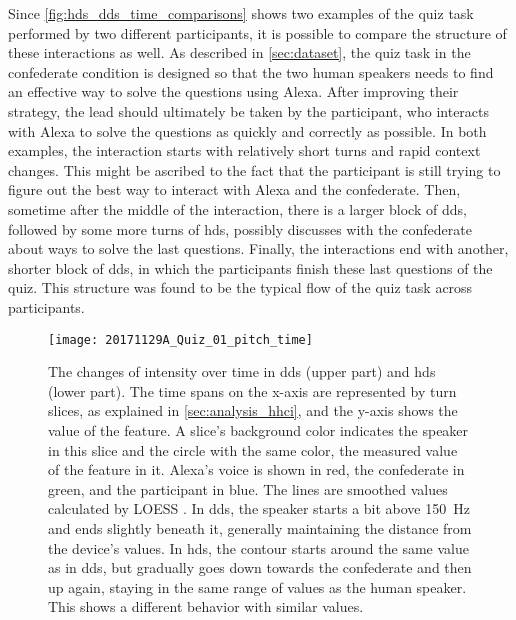 Since \cref{fig:hds_dds_time_comparisons} shows two examples of the quiz task performed by two different participants, it is possible to compare the structure of these interactions as well.
As described in \cref{sec:dataset}, the quiz task in the confederate condition is designed so that the two human speakers needs to find an effective way to solve the questions using Alexa.
After improving their strategy, the lead should ultimately be taken by the participant, who interacts with Alexa to solve the questions as quickly and correctly as possible.
In both examples, the interaction starts with relatively short turns and rapid context changes.
This might be ascribed to the fact that the participant is still trying to figure out the best way to interact with Alexa and the confederate.
Then, sometime after the middle of the interaction, there is a larger block of \ac{dds}, followed by some more turns of \ac{hds}, possibly discusses with the confederate about ways to solve the last questions.
Finally, the interactions end with another, shorter block of \ac{dds}, in which the participants finish these last questions of the quiz.
This structure was found to be the typical flow of the quiz task across participants.
%
\begin{figure}[t]
	\centering
	\texttt{[image: 20171129A\_Quiz\_01\_pitch\_time]}
	\caption[Comparison of temporal \acs{f0} trends of \acs{hds} and \acs{dds}]
		{The changes of intensity over time in \ac{dds} (upper part) and \ac{hds} (lower part).
		The time spans on the x-axis are represented by turn slices, as explained in \cref{sec:analysis_hhci}, and the y-axis shows the value of the feature.
		A slice's background color indicates the speaker in this slice and the circle with the same color, the measured value of the feature in it.
		Alexa's voice is shown in red, the confederate in green, and the participant in blue.
		The lines are smoothed values calculated by LOESS \citep{Cleveland1988locally}.
		In \ac{dds}, the speaker starts a bit above \SI{150}{\hertz} and ends slightly beneath it, generally maintaining the distance from the device's values.
		In \ac{hds}, the contour starts around the same value as in \ac{dds}, but gradually goes down towards the confederate and then up again, staying in the same range of values as the human speaker.
		This shows a different behavior with similar values.}
	\label{fig:hds_dds_time_pitch}
\end{figure}
%
